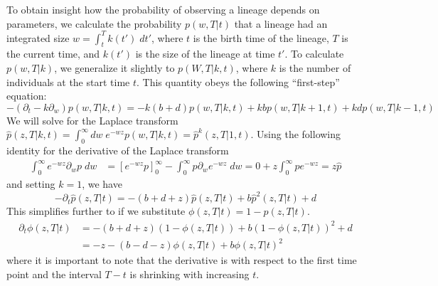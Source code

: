 \documentclass[9pt,twocolumn,twoside]{gsajnl_modified}
\begin{document}
To obtain insight how the probability of observing a lineage depends on parameters, we calculate the probability $p(w, T|t)$ that a lineage had an integrated size $w = \int_t^T k(t') \; dt'$, where $t$ is the birth time of the lineage, $T$ is the current time, and $k(t')$ is the size of the lineage at time $t'$.
To calculate $p(w,T|k)$, we generalize it slightly to $p(W, T|k,t)$, where $k$ is the number of individuals at the start time $t$. This quantity obeys the following ``first-step'' equation:
\begin{equation}
    -(\partial_t - k \partial_w) p(w,T|k,t) = -k(b+d) p(w,T|k,t) + k b p(w,T|k+1,t) + k d p(w,T| k-1, t)
\end{equation}
We will solve for the Laplace transform $\hat{p}(z,T|k,t) = \int_0^\infty dw\; e^{-wz} p(w,T|k,t) = \hat{p}^k(z,T|1,t)$.
Using the following identity for the derivative of the Laplace transform
\begin{equation}
    \begin{split}
        \int_0^\infty e^{-wz} \partial_w p  \; dw& = [e^{-wz} p]_0^\infty - \int_0^\infty  p \partial_w e^{-wz} \; dw = 0 + z \int_0^\infty  p e^{-wz} = z \hat{p}
    \end{split}
\end{equation}
and setting $k=1$, we have
\begin{equation}
    -\partial_t \hat{p}(z,T|t) = -(b+d+z) \hat{p}(z,T|t) + b \hat{p}^2(z,T|t) + d
\end{equation}
This simplifies further to if we substitute $\phi(z,T|t) = 1 - \hat{p}(z,T|t)$.
\begin{equation}
    \begin{split}
        \partial_t \phi(z,T|t) & = -(b+d+z) (1-\phi(z,T|t)) + b (1-\phi(z,T|t))^2 + d \\
         & = -z - (b-d-z) \phi(z,T|t) + b \phi(z,T|t)^2
    \end{split}
\end{equation}
where it is important to note that the derivative is with respect to the first time point and the interval $T-t$ is shrinking with increasing $t$.
\end{document}
